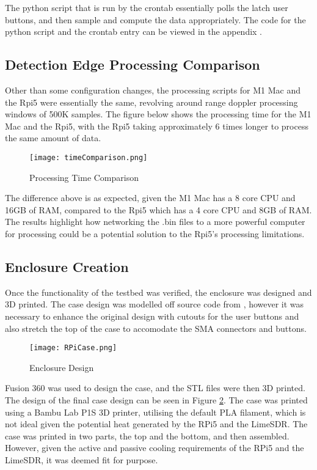 The python script that is run by the crontab essentially polls the latch user buttons, and then sample and compute the data appropriately. The code for the python script and the crontab entry can be viewed in the appendix .

\subsection{Detection Edge Processing Comparison} \label{sec:edgeProcessing}
Other than some configuration changes, the processing scripts for M1 Mac and the Rpi5 were essentially the same, revolving around range doppler processing windows of 500K samples. The figure below shows the processing time for the M1 Mac and the Rpi5, with the Rpi5 taking approximately 6 times longer to process the same amount of data.

\begin{figure}[h!]
    \centering
    \texttt{[image: timeComparison.png]}
    \caption{Processing Time Comparison}
    \label{fig:processingTime}
\end{figure}

The difference above is as expected, given the M1 Mac has a 8 core CPU and 16GB of RAM, compared to the Rpi5 which has a 4 core CPU and 8GB of RAM. The results highlight how networking the .bin files to a more powerful computer for processing could be a potential solution to the Rpi5's processing limitations.

\subsection{Enclosure Creation} \label{sec:enclosureResults}
Once the functionality of the testbed was verified, the enclosure was designed and 3D printed. The case design was modelled off source code from \cite{RPiCase}, however it was necessary to enhance the original design with cutouts for the user buttons and also stretch the top of the case to accomodate the SMA connectors and buttons. 

\begin{figure}[h!]
    \centering
    \texttt{[image: RPiCase.png]}
    \caption{Enclosure Design}
    \label{fig:enclosureDesign}
\end{figure}

Fusion 360 was used to design the case, and the STL files were then 3D printed. The design of the final case design can be seen in Figure \ref{fig:enclosureDesign}. The case was printed using a Bambu Lab P1S 3D printer, utilising the default PLA filament, which is not ideal given the potential heat generated by the RPi5 and the LimeSDR. The case was printed in two parts, the top and the bottom, and then assembled. However, given the active and passive cooling requirements of the RPi5 and the LimeSDR, it was deemed fit for purpose.


